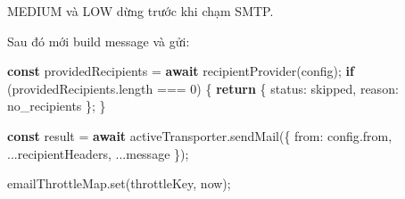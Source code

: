 \documentclass[11pt,oneside,openany]{book}
\newenvironment{Shaded}{\begin{snugshade}}{\end{snugshade}}
\newcommand{\AttributeTok}[1]{\textcolor[rgb]{0.16,0.50,0.73}{#1}}
\newcommand{\BuiltInTok}[1]{\textcolor[rgb]{0.50,0.55,0.55}{#1}}
\newcommand{\ControlFlowTok}[1]{\textcolor[rgb]{0.99,0.74,0.29}{\textbf{#1}}}
\newcommand{\DataTypeTok}[1]{\textcolor[rgb]{0.16,0.50,0.73}{#1}}
\newcommand{\DecValTok}[1]{\textcolor[rgb]{0.96,0.45,0.00}{#1}}
\newcommand{\FunctionTok}[1]{\textcolor[rgb]{0.56,0.27,0.68}{#1}}
\newcommand{\KeywordTok}[1]{\textcolor[rgb]{0.81,0.81,0.76}{\textbf{#1}}}
\newcommand{\NormalTok}[1]{\textcolor[rgb]{0.81,0.81,0.76}{#1}}
\newcommand{\OperatorTok}[1]{\textcolor[rgb]{0.81,0.81,0.76}{#1}}
\newcommand{\SpecialCharTok}[1]{\textcolor[rgb]{0.24,0.68,0.91}{#1}}
\newcommand{\StringTok}[1]{\textcolor[rgb]{0.96,0.31,0.31}{#1}}
\newcommand{\VerbatimStringTok}[1]{\textcolor[rgb]{0.85,0.27,0.33}{#1}}
\renewenvironment{Shaded}{%
  \def\FrameCommand{\fboxsep=8pt\colorbox{shadecolor}}%
  \MakeFramed{\advance\hsize-\width\FrameRestore}%
}{\endMakeFramed}
\begin{document}
MEDIUM và LOW dừng trước khi chạm SMTP.

\begin{Shaded}
\end{Shaded}

Sau đó mới build message và gửi:

\begin{Shaded}
\begin{Highlighting}[]
\KeywordTok{const}\NormalTok{ providedRecipients }\OperatorTok{=} \ControlFlowTok{await} \FunctionTok{recipientProvider}\NormalTok{(config)}\OperatorTok{;}
\ControlFlowTok{if}\NormalTok{ (providedRecipients}\OperatorTok{.}\AttributeTok{length} \OperatorTok{===} \DecValTok{0}\NormalTok{) \{}
  \ControlFlowTok{return}\NormalTok{ \{ }\DataTypeTok{status}\OperatorTok{:} \StringTok{\textquotesingle{}skipped\textquotesingle{}}\OperatorTok{,} \DataTypeTok{reason}\OperatorTok{:} \StringTok{\textquotesingle{}no\_recipients\textquotesingle{}}\NormalTok{ \}}\OperatorTok{;}
\NormalTok{\}}

\KeywordTok{const}\NormalTok{ result }\OperatorTok{=} \ControlFlowTok{await}\NormalTok{ activeTransporter}\OperatorTok{.}\FunctionTok{sendMail}\NormalTok{(\{}
  \DataTypeTok{from}\OperatorTok{:}\NormalTok{ config}\OperatorTok{.}\AttributeTok{from}\OperatorTok{,}
  \OperatorTok{...}\NormalTok{recipientHeaders}\OperatorTok{,}
  \OperatorTok{...}\NormalTok{message}
\NormalTok{\})}\OperatorTok{;}

\NormalTok{emailThrottleMap}\OperatorTok{.}\FunctionTok{set}\NormalTok{(throttleKey}\OperatorTok{,}\NormalTok{ now)}\OperatorTok{;}
\end{Highlighting}
\end{Shaded}
\end{document}
